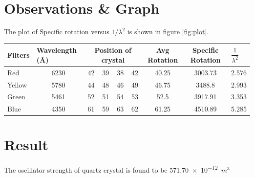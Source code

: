 	\section{Observations \& Graph}
	
	
	
	The plot of Specific rotation  versus $ 1/\lambda^2 $ is shown in figure 
	\ref{fig:plot}.
	
	
	\begin{table}[h]
		\begin{tabular}{|l|c|c|c|c|c|c|c|c|}
			\hline
			Filters & \multicolumn{1}{l|}{Wavelength (\AA)} & \multicolumn{4}{c|}{Position of crystal} & Avg Rotation & Specific Rotation & \multicolumn{1}{l|}{$\dfrac{1}{\lambda^2}$}\\ \hline
			Red     & 6230                                                       & 42       & 39       & 38       & 42      & 40.25        & 3003.73           & 2.576                                           \\ \hline
			Yellow  & 5780                                                       & 44       & 48       & 46       & 49      & 46.75        & 3488.8            & 2.993                                           \\ \hline
			Green   & 5461                                                       & 52       & 51       & 54       & 53      & 52.5         & 3917.91           & 3.353                                           \\ \hline
			Blue    & 4350                                                       & 61       & 59       & 63       & 62      & 61.25        & 4510.89           & 5.285                                           \\ \hline
		\end{tabular}
	\end{table}
	\clearpage
	\section{Result}
	The oscillator strength of quartz crystal is found to be \num{571.70 e-12}\ $m^3$
	
	
